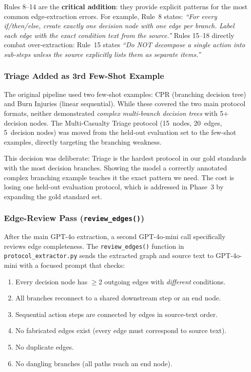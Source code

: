 \documentclass[12pt,a4paper]{article}
\begin{document}
Rules 8--14 are the \textbf{critical addition}: they provide explicit patterns for the most common edge-extraction errors. For example, Rule~8 states: \emph{``For every if/then/else, create exactly one decision node with one edge per branch. Label each edge with the exact condition text from the source.''} Rules 15--18 directly combat over-extraction: Rule~15 states \emph{``Do NOT decompose a single action into sub-steps unless the source explicitly lists them as separate items.''}

\subsubsection{Triage Added as 3rd Few-Shot Example}

The original pipeline used two few-shot examples: CPR (branching decision tree) and Burn Injuries (linear sequential). While these covered the two main protocol formats, neither demonstrated \emph{complex multi-branch decision trees} with 5+ decision nodes. The Multi-Casualty Triage protocol (15~nodes, 20~edges, 5~decision nodes) was moved from the held-out evaluation set to the few-shot examples, directly targeting the branching weakness.

This decision was deliberate: Triage is the hardest protocol in our gold standards with the most decision branches. Showing the model a correctly annotated complex branching example teaches it the exact pattern we need. The cost is losing one held-out evaluation protocol, which is addressed in Phase~3 by expanding the gold standard set.

\subsubsection{Edge-Review Pass (\texttt{review\_edges()})}

After the main GPT-4o extraction, a second GPT-4o-mini call specifically reviews edge completeness. The \texttt{review\_edges()} function in \texttt{protocol\_extractor.py} sends the extracted graph and source text to GPT-4o-mini with a focused prompt that checks:

\begin{enumerate}[leftmargin=2em]
    \item Every decision node has $\geq$2 outgoing edges with \emph{different} conditions.
    \item All branches reconnect to a shared downstream step or an end node.
    \item Sequential action steps are connected by edges in source-text order.
    \item No fabricated edges exist (every edge must correspond to source text).
    \item No duplicate edges.
    \item No dangling branches (all paths reach an end node).
\end{enumerate}
\end{document}
